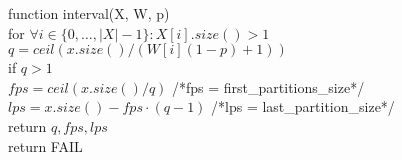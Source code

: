 function interval(X, W, p) \\
\indent for $\forall i \in \{0, \dots, |X|-1\}: X[i].size() > 1$ \\
\indent \indent $q = ceil(x.size()/(W[i](1 - p) + 1))$ \\
\indent \indent if $q > 1$ \\
\indent \indent \indent $fps = ceil(x.size()/q)$ /*fps = first\_partitions\_size*/\\
\indent \indent \indent $lps = x.size() - fps \cdot (q-1)$ /*lps = last\_partition\_size*/\\
\indent \indent \indent return $q, fps, lps$\\
\indent return FAIL\\